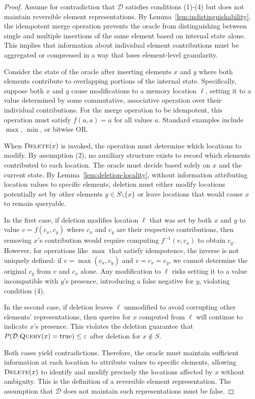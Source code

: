 \begin{proof}
    Assume for contradiction that $\mathcal{D}$ satisfies conditions (1)-(4) but does not maintain reversible element representations. By Lemma~\ref{lem:indistinguishability}, the idempotent merge operation prevents the oracle from distinguishing between single and multiple insertions of the same element based on internal state alone. This implies that information about individual element contributions must be aggregated or compressed in a way that loses element-level granularity.

    Consider the state of the oracle after inserting elements $x$ and $y$ where both elements contribute to overlapping portions of the internal state. Specifically, suppose both $x$ and $y$ cause modifications to a memory location $\ell$, setting it to a value determined by some commutative, associative operation over their individual contributions. For the merge operation to be idempotent, this operation must satisfy $f(a, a) = a$ for all values $a$. Standard examples include $\max$, $\min$, or bitwise OR.

    When $\textsc{Delete}(x)$ is invoked, the operation must determine which locations to modify. By assumption (2), no auxiliary structure exists to record which elements contributed to each location. The oracle must decide based solely on $x$ and the current state. By Lemma~\ref{lem:deletion-locality}, without information attributing location values to specific elements, deletion must either modify locations potentially set by other elements $y \in S \setminus \{x\}$ or leave locations that would cause $x$ to remain queryable.

    In the first case, if deletion modifies location $\ell$ that was set by both $x$ and $y$ to value $v = f(c_x, c_y)$ where $c_x$ and $c_y$ are their respective contributions, then removing $x$'s contribution would require computing $f^{-1}(v, c_x)$ to obtain $c_y$. However, for operations like $\max$ that satisfy idempotence, the inverse is not uniquely defined: if $v = \max(c_x, c_y)$ and $v = c_x = c_y$, we cannot determine the original $c_y$ from $v$ and $c_x$ alone. Any modification to $\ell$ risks setting it to a value incompatible with $y$'s presence, introducing a false negative for $y$, violating condition (4).

    In the second case, if deletion leaves $\ell$ unmodified to avoid corrupting other elements' representations, then queries for $x$ computed from $\ell$ will continue to indicate $x$'s presence. This violates the deletion guarantee that $P(\mathcal{D}.\textsc{Query}(x) = \text{true}) \leq \varepsilon$ after deletion for $x \notin S$.

    Both cases yield contradictions. Therefore, the oracle must maintain sufficient information at each location to attribute values to specific elements, allowing $\textsc{Delete}(x)$ to identify and modify precisely the locations affected by $x$ without ambiguity. This is the definition of a reversible element representation. The assumption that $\mathcal{D}$ does not maintain such representations must be false.
\end{proof}

